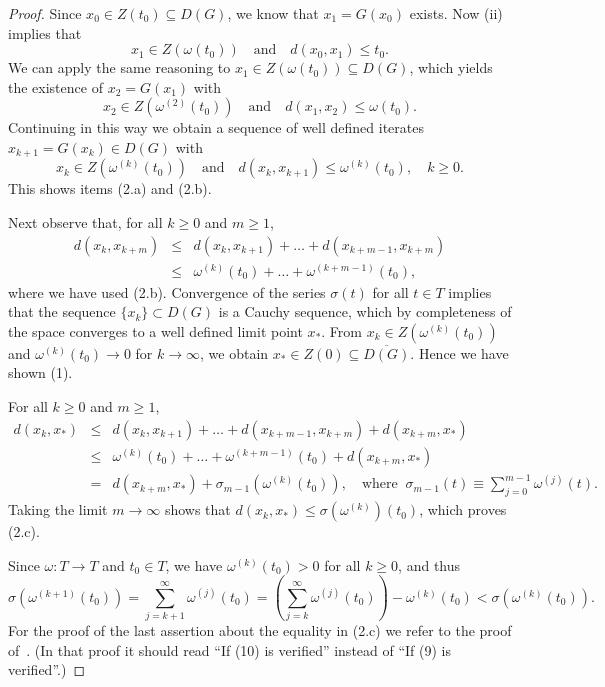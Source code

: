 \documentclass{siamltex}
\begin{document}
\medskip
\begin{proof}
Since $x_0\in Z(t_0)\subseteq D(G)$, we know that $x_1=G(x_0)$ exists. Now (ii) implies that
$$x_1\in Z(\omega(t_0))\quad\mbox{and}\quad d(x_0,x_1)\leq t_0.$$
We can apply the same reasoning to $x_1\in Z(\omega(t_0))\subseteq D(G)$, which yields the
existence of $x_2=G(x_1)$ with
$$x_2\in Z(\omega^{(2)}(t_0))\quad\mbox{and}\quad d(x_1,x_2)\leq \omega(t_0).$$
Continuing in this way we obtain a sequence of well defined iterates $x_{k+1}=G(x_{k})\in D(G)$ with
$$x_k\in Z(\omega^{(k)}(t_0))\quad\mbox{and}\quad
d(x_{k},x_{k+1})\leq \omega^{(k)}(t_0),\quad k\geq 0.$$
This shows items (2.a) and (2.b).

Next observe that, for all $k\geq 0$ and $m\geq 1$,
\begin{eqnarray*}
d(x_{k},x_{k+m})&\leq& d(x_{k},x_{k+1})+\dots+d(x_{k+m-1},x_{k+m})\\
&\leq& \omega^{(k)}(t_0)+\dots+\omega^{(k+m-1)}(t_0),
\end{eqnarray*}
where we have used (2.b). Convergence of the series $\sigma(t)$ for all $t\in T$
implies that the sequence $\{x_k\}\subset D(G)$ is a Cauchy sequence, which by
completeness of the space converges to a well defined limit point $x_*$. From
$x_k\in Z(\omega^{(k)}(t_0))$ and $\omega^{(k)}(t_0)\rightarrow 0$ for
$k\rightarrow\infty$, we obtain $x_*\in Z(0)\subseteq \overline{D(G)}$. Hence we
have shown (1).

For all $k\geq 0$ and $m\geq 1$,
\begin{eqnarray*}
d(x_{k},x_{*})&\leq& d(x_{k},x_{k+1})+\dots+d(x_{k+m-1},x_{k+m})+d(x_{k+m},x_*)\\
&\leq& \omega^{(k)}(t_0)+\dots+\omega^{(k+m-1)}(t_0)+d(x_{k+m},x_*)\\
&=&d(x_{k+m},x_*) +\sigma_{m-1}(\omega^{(k)}(t_0)),\quad \mbox{where}\;\;
\sigma_{m-1}(t)\equiv\sum_{j=0}^{m-1}\omega^{(j)}(t).
\end{eqnarray*}
Taking the limit $m\rightarrow\infty$ shows that $d(x_{k},x_{*})\leq
\sigma(\omega^{(k)})(t_0)$, which proves (2.c).

Since $\omega:T\rightarrow T$ and $t_0\in T$, we have $\omega^{(k)}(t_0)>0$ for all $k\geq 0$,
and thus
$$\sigma(\omega^{(k+1)}(t_0))=\sum_{j=k+1}^\infty \omega^{(j)}(t_0)=
\left(\sum_{j=k}^\infty \omega^{(j)}(t_0)\right)-\omega^{(k)}(t_0)<\sigma(\omega^{(k)}(t_0)).$$
For the proof of the last assertion about the equality in (2.c) we refer to the proof
of~\cite[Proposition~1.11]{PotPtaBook84}. (In that proof it should read ``If (10) is
verified'' instead of ``If (9) is verified''.)
\end{proof}
\end{document}
